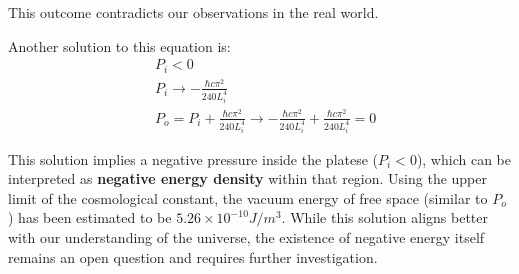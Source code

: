This outcome contradicts our observations in the real world.

Another solution to this equation is:
\begin{align}
    &P_i < 0 \\
    &P_i \rightarrow -\frac{\hbar c \pi^2}{240 L_i^4} \\
    &P_o = P_i + \frac{\hbar c \pi^2}{240 L_i^4} \rightarrow -\frac{\hbar c \pi^2}{240 L_i^4} + \frac{\hbar c \pi^2}{240 L_i^4} = 0
\end{align}

This solution implies a negative pressure inside the platese ($P_i < 0$), which can be interpreted as \textbf{negative energy density} within that region.
Using the upper limit of the cosmological constant, 
the vacuum energy of free space (similar to $P_o$) has been estimated to be $5.26\times10^{−10} J/m^3$\citep*{collaboration2020planck}.
While this solution aligns better with our understanding of the universe, 
the existence of negative energy itself remains an open question and requires further investigation.
